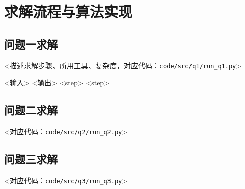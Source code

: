\section{求解流程与算法实现}

\subsection{问题一求解}

<描述求解步骤、所用工具、复杂度，对应代码：\texttt{code/src/q1/run\_q1.py}>

\begin{algorithm}[H]
  \caption{<问题一求解算法>}
  \begin{algorithmic}[1]
    \Require <输入>
    \Ensure <输出>
    \State <step>
    \State <step>
  \end{algorithmic}
\end{algorithm}

\subsection{问题二求解}

<对应代码：\texttt{code/src/q2/run\_q2.py}>

\subsection{问题三求解}

<对应代码：\texttt{code/src/q3/run\_q3.py}>
